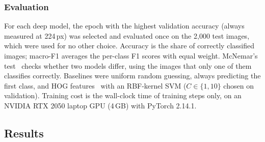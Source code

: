 \documentclass[10pt,twocolumn]{article}
\begin{document}
\subsubsection{Evaluation}
For each deep model, the epoch with the highest validation accuracy (always measured at 224\,px) was
selected and evaluated once on the 2{,}000 test images, which were used for no other choice. Accuracy is
the share of correctly classified images; macro-F1 averages the per-class F1 scores with equal weight.
McNemar's test~\cite{mcnemar1947note} checks whether two models differ, using the images that only one
of them classifies correctly. Baselines were uniform random guessing, always predicting the first
class, and HOG features~\cite{dalal2005histograms} with an RBF-kernel SVM ($C\in\{1,10\}$ chosen on
validation). Training cost is the wall-clock time of training steps only, on an NVIDIA RTX 2050 laptop
GPU (4\,GB) with PyTorch 2.14.1.

\subsection{Results}
\begin{table}[t]
\centering\small
{}
\caption{Test results on 2{,}000 CIFAR-10 images (one run per model, seed 42). Validation accuracy is at
the selected epoch; time is training-step wall-clock time; the train--val gap is measured at the
selected epoch on augmented training inputs. $p$ is McNemar's test against A. $^\dagger$Not comparable
under Mixup, where training accuracy uses mixed labels.}
\label{tab:main}
\end{table}
\end{document}
